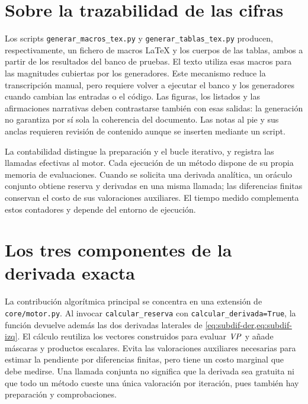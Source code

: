 \fi

\section{Sobre la trazabilidad de las cifras}

Los scripts
\texttt{generar\_macros\_tex.py} y \texttt{generar\_tablas\_tex.py} producen,
respectivamente, un fichero de macros \LaTeX{} y los cuerpos de las tablas, ambos a
partir de los resultados del banco de pruebas. El texto utiliza esas macros para
las magnitudes cubiertas por los generadores. Este mecanismo reduce la
transcripción manual, pero requiere volver a ejecutar el banco y los generadores
cuando cambian las entradas o el código. Las figuras, los listados y las
afirmaciones narrativas deben contrastarse también con esas salidas: la generación
no garantiza por sí sola la coherencia del documento. Las notas al pie y sus
anclas requieren revisión de contenido aunque se inserten mediante un script.

La contabilidad distingue la preparación y el bucle iterativo, y registra las
llamadas efectivas al motor. Cada ejecución de un método dispone de su propia
memoria de evaluaciones. Cuando se solicita una derivada analítica, un oráculo
conjunto obtiene reserva y derivadas en una misma llamada; las diferencias finitas
conservan el costo de sus valoraciones auxiliares. El tiempo medido complementa
estos contadores y depende del entorno de ejecución.

\section{Los tres componentes de la derivada exacta}

La contribución algorítmica principal se concentra en una extensión de
\texttt{core/motor.py}. Al invocar \texttt{calcular\_reserva} con
\texttt{calcular\_derivada=True}, la función devuelve además las dos derivadas
laterales de \cref{eq:subdif-der,eq:subdif-izq}. El cálculo reutiliza los vectores
construidos para evaluar $\mathit{VP}$ y añade máscaras y productos escalares. Evita las
valoraciones auxiliares necesarias para estimar la pendiente por diferencias
finitas, pero tiene un costo marginal que debe medirse. Una llamada conjunta no
significa que la derivada sea gratuita ni que todo un método cueste una única
valoración por iteración, pues también hay preparación y comprobaciones.


